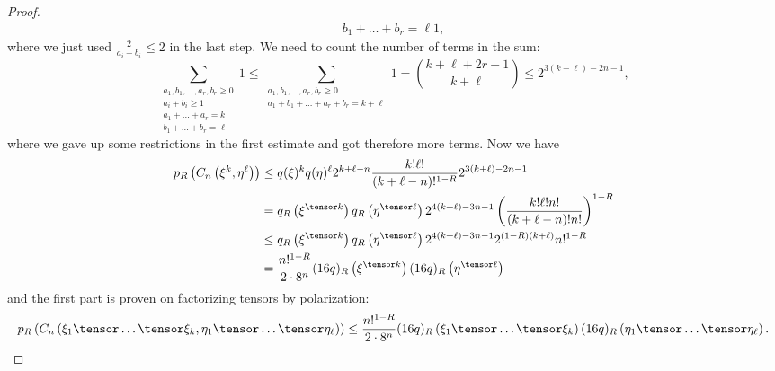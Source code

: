\begin{proof}
\begin{align*}
{{            b_1 + \ldots + b_r = \ell
          }}
		1,
    \end{align*}
    where we just used $\frac{2}{a_i + b_i} \leq 2$ in the last step. We need
    to count the number of terms in the sum:
    \begin{equation*}
        \sum\limits_{\substack{a_1, b_1, \ldots, a_r, b_r \geq 0 \\
            a_i + b_i \geq 1 \\
            a_1 + \ldots + a_r = k \\
            b_1 + \ldots + b_r = \ell
          }}
		1
		\leq
        \sum\limits_{\substack{a_1, b_1, \ldots, a_r, b_r \geq 0 \\
            a_1 + b_1 + \ldots + a_r + b_r = k + \ell
          }}
		1
		=
		\binom{k + \ell + 2r - 1}{k + \ell}
		\leq
		2^{3(k + \ell) - 2n - 1},
    \end{equation*}
    where we gave up some restrictions in the first estimate and got
    therefore more terms. Now we have
    \begin{align*}
        p_R \left(
            C_n \left( \xi^k, \eta^{\ell} \right)
        \right)
        & \leq
        q(\xi)^k q(\eta)^{\ell}
        2^{k + \ell - n}
        \frac{k! \ell!}{(k + \ell - n)!^{1-R}}
        2^{3(k + \ell) - 2n - 1}
        \\
        & =
        q_R \left( \xi^{\tensor k} \right)
        q_R \left( \eta^{\tensor \ell} \right)
        2^{4(k + \ell) - 3n - 1}
        \left(
        	\frac{k! \ell! n!}{(k + \ell - n)! n!}
        \right)^{1-R}
        \\
        & \leq
        q_R \left( \xi^{\tensor k} \right)
        q_R \left( \eta^{\tensor \ell} \right)
        2^{4(k + \ell) - 3n - 1}
        2^{(1 - R)(k + \ell)}
        n!^{1 - R}
        \\
        & =
        \frac{n!^{1 - R}}{2 \cdot 8^n}
        (16 q)_R \left( \xi^{\tensor k} \right)
        (16 q)_R \left( \eta^{\tensor \ell} \right)
    \end{align*}
    and the first part is proven on factorizing tensors by polarization:
    \begin{equation*}
    	p_R
    	\left( C_n \left(
    		\xi_1 \tensor \ldots \tensor \xi_k
    		,
    		\eta_1 \tensor \ldots \tensor \eta_{\ell}
    	\right) \right)
    	\leq
    	\frac{n!^{1 - R}}{2 \cdot 8^n}
    	(16 q)_R
    	\left(
    		\xi_1 \tensor \ldots \tensor \xi_k
    	\right)
    	(16 q)_R
    	\left(
    		\eta_1 \tensor \ldots \tensor \eta_{\ell}
    	\right).

\end{equation*}
\end{proof}
